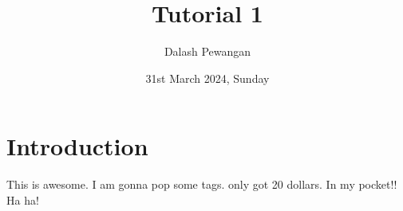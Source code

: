 \documentclass{article}
\title{Tutorial 1}
\author{Dalash Pewangan}
\date{31st March 2024, Sunday}
\begin{document}
\maketitle

\section{Introduction}
This is awesome. I am gonna pop some tags. only got 20 dollars. 
In my pocket!! Ha ha!
\end{document}
